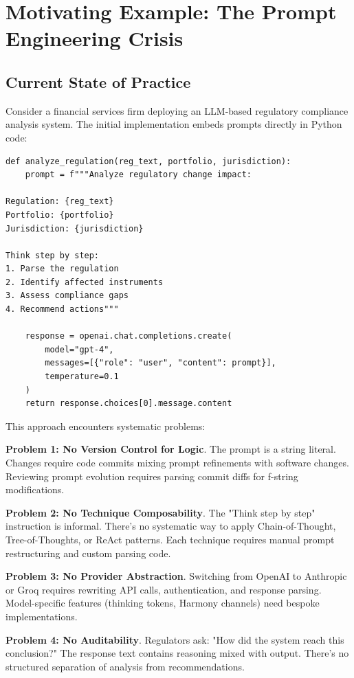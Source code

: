 \documentclass[11pt,a4paper]{article}
\begin{document}
\section{Motivating Example: The Prompt Engineering Crisis}

\subsection{Current State of Practice}

Consider a financial services firm deploying an LLM-based regulatory compliance analysis system. The initial implementation embeds prompts directly in Python code:

\begin{lstlisting}[caption=Ad-hoc prompt engineering (current practice)]
def analyze_regulation(reg_text, portfolio, jurisdiction):
    prompt = f"""Analyze regulatory change impact:

Regulation: {reg_text}
Portfolio: {portfolio}
Jurisdiction: {jurisdiction}

Think step by step:
1. Parse the regulation
2. Identify affected instruments
3. Assess compliance gaps
4. Recommend actions"""

    response = openai.chat.completions.create(
        model="gpt-4",
        messages=[{"role": "user", "content": prompt}],
        temperature=0.1
    )
    return response.choices[0].message.content
\end{lstlisting}

This approach encounters systematic problems:

\textbf{Problem 1: No Version Control for Logic}. The prompt is a string literal. Changes require code commits mixing prompt refinements with software changes. Reviewing prompt evolution requires parsing commit diffs for f-string modifications.

\textbf{Problem 2: No Technique Composability}. The "Think step by step" instruction is informal. There's no systematic way to apply Chain-of-Thought, Tree-of-Thoughts, or ReAct patterns. Each technique requires manual prompt restructuring and custom parsing code.

\textbf{Problem 3: No Provider Abstraction}. Switching from OpenAI to Anthropic or Groq requires rewriting API calls, authentication, and response parsing. Model-specific features (thinking tokens, Harmony channels) need bespoke implementations.

\textbf{Problem 4: No Auditability}. Regulators ask: "How did the system reach this conclusion?" The response text contains reasoning mixed with output. There's no structured separation of analysis from recommendations.
\end{document}

